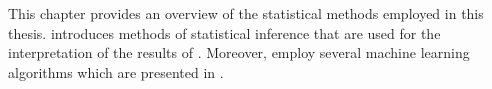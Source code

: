 This chapter provides an overview of the statistical methods employed in this
thesis.  introduces methods of statistical
inference that are used for the interpretation of the results of
. Moreover,
 employ several machine
learning algorithms which are presented in .

